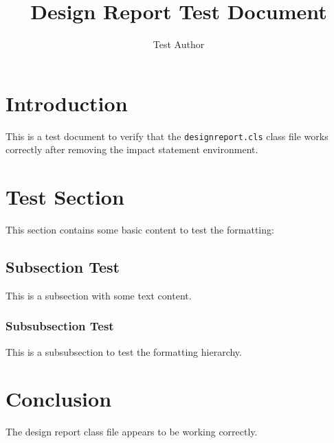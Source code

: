 \documentclass{designreport}
\title{Design Report Test Document}
\author{Test Author}
\begin{document}
\maketitle

\tableofcontents
\newpage

\section{Introduction}

This is a test document to verify that the \texttt{designreport.cls} class file works correctly after removing the impact statement environment.

\section{Test Section}

This section contains some basic content to test the formatting:

\subsection{Subsection Test}

This is a subsection with some text content.

\subsubsection{Subsubsection Test}

This is a subsubsection to test the formatting hierarchy.

\section{Conclusion}

The design report class file appears to be working correctly.
\end{document}
